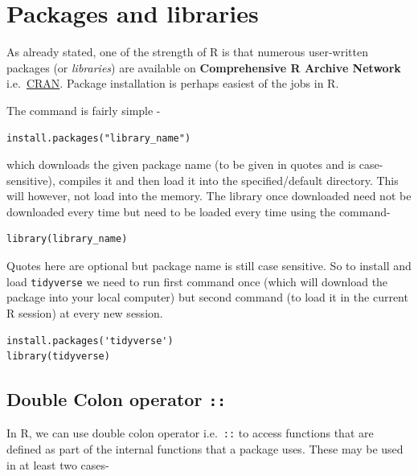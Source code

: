 \documentclass[
]{book}
\begin{document}
\hypertarget{packages-and-libraries}{%
\section{Packages and libraries}\label{packages-and-libraries}}

As already stated, one of the strength of R is that numerous user-written packages (or \emph{libraries})  are available on \textbf{Comprehensive R Archive Network} i.e.~\href{https://cran.r-project.org/}{CRAN}. Package installation is perhaps easiest of the jobs in R.

The command  is fairly simple -

\begin{verbatim}
install.packages("library_name")
\end{verbatim}

which downloads the given package name (to be given in quotes and is case-sensitive), compiles it and then load it into the specified/default directory. This will however, not load into the memory. The library once downloaded need not be downloaded every time but need to be loaded every time using the command- 

\begin{verbatim}
library(library_name)
\end{verbatim}

Quotes here are optional but package name is still case sensitive. So to install and load \texttt{tidyverse} we need to run first command once (which will download the package into your local computer) but second command (to load it in the current R session) at every new session.

\begin{verbatim}
install.packages('tidyverse')
library(tidyverse)
\end{verbatim}

\hypertarget{double-colon-operator}{%
\subsection{\texorpdfstring{Double Colon operator \texttt{::}}{Double Colon operator ::}}\label{double-colon-operator}}

In R, we can use double colon operator  i.e.~\texttt{::} to access functions that are defined as part of the internal functions that a package uses. These may be used in at least two cases-
\end{document}
